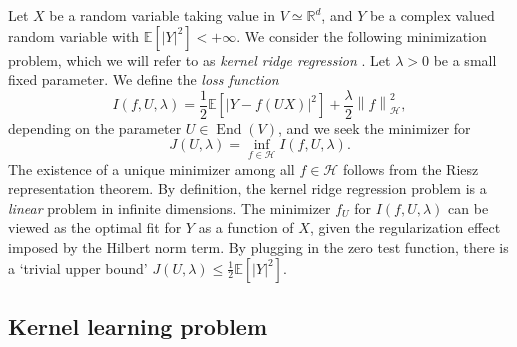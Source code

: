 \documentclass[a4paper]{article}
\theoremstyle{definition}
\newcommand{\R}{\mathbb{R}}
\newcommand{\norm}[1]{\left\lVert#1\right\rVert}
\newcommand{\E}{\mathbb{E}}
\newcommand{\1}{\mathbbm{1}}
\DeclareMathOperator{\End}{End}
\begin{document}
	Let $X$ be a random variable taking value in $V\simeq \R^d$, and $Y$ be a complex valued random variable with $\E[|Y|^2]<+\infty$. 
	We consider the following minimization problem, which we will refer to as \emph{kernel ridge regression} \cite{RuanLi}. Let $\lambda>0$ be a small fixed parameter. We define the \emph{loss function}
	\begin{equation}
		I(f, U, \lambda)= \frac{1}{2} \E[ |Y-f(UX)|^2] + \frac{\lambda}{2} \norm{f}_{\mathcal{H}}^2,
	\end{equation}
	depending on the parameter $U\in \End(V)$, and we seek the minimizer for
	\[
	J(U, \lambda)=  \inf_{f\in \mathcal{H}} I(f,U,\lambda).
	\]
	The existence of a unique minimizer among all $f\in \mathcal{H}$ follows from the Riesz representation theorem. By definition, the kernel ridge regression problem is a \emph{linear} problem in infinite dimensions. The minimizer $f_U$ for $I(f,U,\lambda)$ can be viewed as the optimal fit for $Y$ as a function of $X$, given the regularization effect imposed by the Hilbert norm term. By plugging in the zero test function, there is a `trivial upper bound' $J(U,\lambda)\leq \frac{1}{2}\E[|Y|^2]$. 
	
	
	
	
	
	
	
	
	
	
	
	
	
	
	
	
	
	
	
	
	
	
	
	
	
	
	
	
	\subsection{Kernel learning problem}
	
	
	
	
	
	
	
	
	
	
	
	
	
\end{document}
